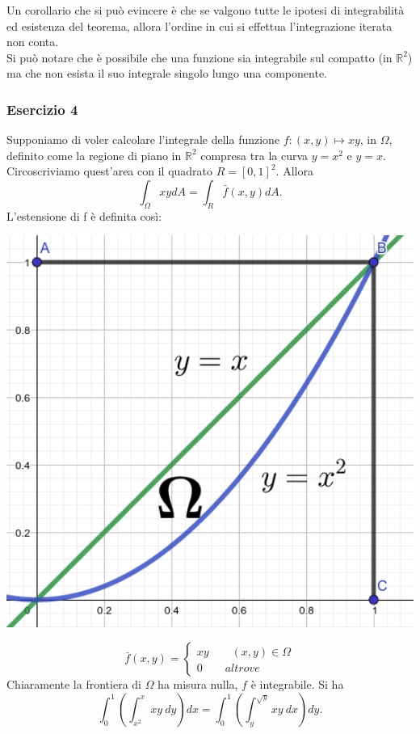 \documentclass[10pt]{article}
\theoremstyle{plain}
\theoremstyle{definition}
\begin{document}
Un corollario che si può evincere è che se valgono tutte le ipotesi di integrabilità ed esistenza del teorema, allora l'ordine in cui si effettua l'integrazione iterata non conta.
\\ Si può notare che è possibile che una funzione sia integrabile sul compatto (in $\mathbb{R}^2$) ma che non esista il suo integrale singolo lungo una componente.
\subsubsection{Esercizio 4}
\begin{minipage}{.5\textwidth}
Supponiamo di voler calcolare l'integrale della funzione $f:(x,y)\mapsto xy$, in $\Omega$, definito come la regione di piano in $\mathbb{R}^2$ compresa tra la curva $y=x^2$ e $y=x$. Circoscriviamo quest'area con il quadrato $R=[0,1]^2$. Allora
$$\int_\Omega xy dA=\int_R\bar{f}(x,y)dA.$$ L'estensione di f è definita così:

\end{minipage}%
\begin{minipage}{.50\textwidth}
\centering
\includegraphics[width=1\textwidth]{fig7.jpg}
\end{minipage}
\begin{equation}
  \bar{f}(x,y)=
   \begin{cases}
   xy\qquad (x,y)\in \Omega\\0 \qquad altrove
   \end{cases}
\end{equation}
Chiaramente la frontiera di $\Omega$ ha misura nulla, $f$ è integrabile.
Si ha 
$$\int_0^1 \left (\int_{x^2}^x xy\ dy\right ) dx=\int_0^1 \left (\int_y^{\sqrt{y}} xy\ dx\right ) dy.$$
\end{document}
